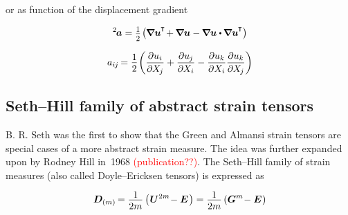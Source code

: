 \vspace{-0.4em} \noindent or as function of the displacement gradient

\nopagebreak\begin{equation*}
{^2\hspace{-0.2ex}\bm{a}} = \smalldisplaystyleonehalf \hspace{-0.2ex} \left( \hspace{-0.1ex}
\boldnabla\bm{u}^{\hspace{-0.1ex}\T} \hspace{-0.3ex}
+ \hspace{-0.1ex} \boldnabla\bm{u}
- \hspace{-0.1ex} \boldnabla\bm{u} \dotp \hspace{-0.1ex} \boldnabla\bm{u}^{\hspace{-0.1ex}\T}
\right)
\end{equation*}

\nopagebreak\vspace{-0.2em}\begin{equation*}
\displaystyle a_{i\hspace{-0.1ex}j} \hspace{-0.2ex} = \onehalf \hspace{-0.25ex} \left(
\frac{\partial u_{i}}{\partial \hspace{-0.1ex} X_{\hspace{-0.15ex}j}}
+ \frac{\partial u_{\hspace{-0.1ex}j}}{\partial \hspace{-0.1ex} X_{i}}
- \frac{\partial u_{k}}{\partial X_{i}} \frac{\partial u_{k}}{\partial \hspace{-0.1ex} X_{\hspace{-0.15ex}j}}
\right)
\end{equation*}

\subsection*{Seth\hbox{--}Hill family of abstract strain tensors}

B. R. Seth was the first to show that the Green and Almansi strain tensors are special cases of a more abstract strain measure. The idea was further expanded upon by Rodney Hill in~1968 \textcolor{red}{(publication??)}. The Seth\hbox{--}Hill family of strain measures (also called Doyle\hbox{--}Ericksen tensors) is expressed as

\nopagebreak\vspace{-0.1em}\begin{equation*}
\displaystyle \bm{D}_{(m)} \hspace{-0.2ex}
= \frac{\raisebox{-0.2em}{1}}{2m} \left( \hspace{.1ex} \bm{U}^{2m} \hspace{-0.4ex} - \UnitDyad \hspace{.2ex} \right)
= \frac{\raisebox{-0.2em}{1}}{2m} \left( \bm{G}^{m} \hspace{-0.4ex} - \UnitDyad \hspace{.1ex} \right) \end{equation*}

